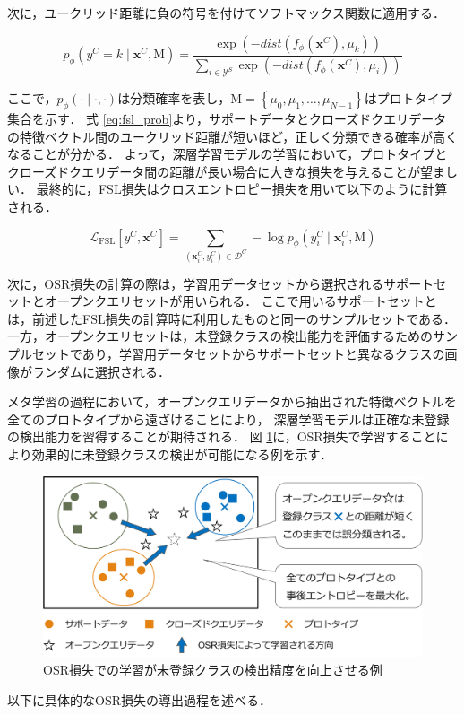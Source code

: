 次に，ユークリッド距離に負の符号を付けてソフトマックス関数に適用する．

\begin{equation}
\label{eq:fsl_prob}
  p_{\phi}(y^C=k \mid \bm{x}^C, \mathrm{M}) 
              = \frac{\exp(-dist(f_\phi(\bm{x}^C),\mu_{k}))}{\sum_{i \in \mathcal{Y}^S} {\exp(-dist(f_\phi(\bm{x}^C),\mu_{i}))}}
\end{equation}

\noindent
ここで，$p_{\phi}(\cdot \mid \cdot, \cdot)$は分類確率を表し，$\mathrm{M} = \left\{\mu_0, \mu_1, \ldots, \mu_{N-1} \right\}$はプロトタイプ集合を示す．
式 \ref{eq:fsl_prob}より，サポートデータとクローズドクエリデータの特徴ベクトル間のユークリッド距離が短いほど，正しく分類できる確率が高くなることが分かる．
よって，深層学習モデルの学習において，プロトタイプとクローズドクエリデータ間の距離が長い場合に大きな損失を与えることが望ましい．
最終的に，FSL損失はクロスエントロピー損失を用いて以下のように計算される．

\begin{equation}
  \mathcal{L}_{\mathrm{FSL}} [y^C, \bm{x}^C] = \sum_{(\bm{x}^C_i,y^C_i) \in \mathcal{D}^C} - \log {p_{\phi} (y^C_i \mid \bm{x}^C_i, \mathrm{M})}
\end{equation}

次に，OSR損失の計算の際は，学習用データセットから選択されるサポートセットとオープンクエリセットが用いられる．
ここで用いるサポートセットとは，前述したFSL損失の計算時に利用したものと同一のサンプルセットである．
一方，オープンクエリセットは，未登録クラスの検出能力を評価するためのサンプルセットであり，学習用データセットからサポートセットと異なるクラスの画像がランダムに選択される．

メタ学習の過程において，オープンクエリデータから抽出された特徴ベクトルを全てのプロトタイプから遠ざけることにより，
深層学習モデルは正確な未登録の検出能力を習得することが期待される．
図 \ref{fig:osr_loss}に，OSR損失で学習することにより効果的に未登録クラスの検出が可能になる例を示す．
% 
\begin{figure}[tbp]
  \centering
  \includegraphics[width=\linewidth, keepaspectratio]{image/osr_loss.png}
  \caption{OSR損失での学習が未登録クラスの検出精度を向上させる例}
  \label{fig:osr_loss}
\end{figure}
% 
以下に具体的なOSR損失の導出過程を述べる．

